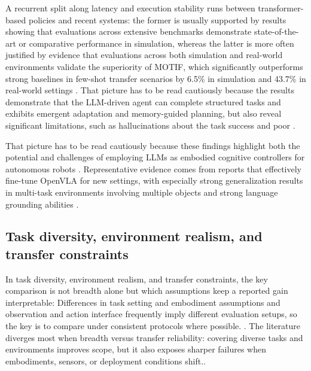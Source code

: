 \documentclass[a4paper,11pt]{article}
\begin{document}
A recurrent split along latency and execution stability runs between transformer-based policies and recent systems: the former is usually supported by results showing that evaluations across extensive benchmarks demonstrate state-of-the-art or comparative performance in simulation, whereas the latter is more often justified by evidence that evaluations across both simulation and real-world environments validate the superiority of MOTIF, which significantly outperforms strong baselines in few-shot transfer scenarios by 6.5\% in simulation and 43.7\% in real-world settings \citep{Zheng2025Soft,Hou2025Dita,Zhi2026Motif,Ye2026St4Vla}. That picture has to be read cautiously because the results demonstrate that the LLM-driven agent can complete structured tasks and exhibits emergent adaptation and memory-guided planning, but also reveal significant limitations, such as hallucinations about the task success and poor \citep{Shaji2026From}.

That picture has to be read cautiously because these findings highlight both the potential and challenges of employing LLMs as embodied cognitive controllers for autonomous robots \citep{Shaji2026From}. Representative evidence comes from reports that effectively fine-tune OpenVLA for new settings, with especially strong generalization results in multi-task environments involving multiple objects and strong language grounding abilities \citep{Kim2024Openvla}.

\subsection{Task diversity, environment realism, and transfer constraints}


In task diversity, environment realism, and transfer constraints, the key comparison is not breadth alone but which assumptions keep a reported gain interpretable: Differences in task setting and embodiment assumptions and observation and action interface frequently imply different evaluation setups, so the key is to compare under consistent protocols where possible. \citep{Sridhar2025Ricl,Torne2026Multi,Vo2025Clutter,Wu2025Moto}. The literature diverges most when breadth versus transfer reliability: covering diverse tasks and environments improves scope, but it also exposes sharper failures when embodiments, sensors, or deployment conditions shift..
\end{document}
